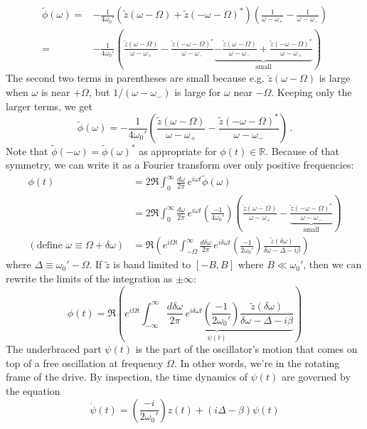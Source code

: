 \documentclass{article}
\begin{document}
\begin{align*}
  \tilde{\phi}(\omega)
  =& - \frac{1}{4 \omega_0'}
  \left( \tilde{z}(\omega - \Omega) + \tilde{z}(-\omega - \Omega)^* \right)
  \left(
    \frac{1}{\omega - \omega_+} - \frac{1}{\omega - \omega_-}
  \right) \\
  =& - \frac{1}{4 \omega_0'}
  \left(
      \frac{\tilde{z}(\omega - \Omega)}{\omega - \omega_+}
    - \frac{\tilde{z}(-\omega - \Omega)^*}{\omega - \omega_-}
    \underbrace{
      - \frac{\tilde{z}(\omega - \Omega)}{\omega - \omega_-}
      + \frac{\tilde{z}(-\omega - \Omega)^*}{\omega - \omega_+}
    }_\text{small}
  \right)
\end{align*}
The second two terms in parentheses are small because e.g. $\tilde{z}(\omega - \Omega)$ is large when $\omega$ is near $+\Omega$, but $1 / (\omega - \omega_-)$ is large for $\omega$ near $-\Omega$.
Keeping only the larger terms, we get
\begin{equation}
  \tilde{\phi}(\omega) =
  - \frac{1}{4 \omega_0'}
  \left(
      \frac{\tilde{z}(\omega - \Omega)}{\omega - \omega_+}
    - \frac{\tilde{z}(-\omega - \Omega)^*}{\omega - \omega_-}
  \right) \, .
\end{equation}
Note that $\tilde{\phi}(-\omega) = \tilde{\phi}(\omega)^*$ as appropriate for $\phi(t) \in \mathbb{R}$.
Because of that symmetry, we can write it as a Fourier transform over only positive frequencies:
\begin{align*}
  \phi(t)
  &= 2 \Re \int_0^\infty \frac{d\omega}{2\pi} \, e^{i \omega t} \tilde{\phi}(\omega) \\
  &= 2 \Re \int_0^\infty \frac{d\omega}{2\pi} \, e^{i \omega t} \left( \frac{-1}{4 \omega_0'} \right)
    \left(
      \frac{\tilde{z}(\omega - \Omega)}{\omega - \omega_+}
      - \underbrace{\frac{\tilde{z}(-\omega - \Omega)^*}{\omega - \omega_-}}_\text{small}
    \right) \\
  (\text{define } \omega \equiv \Omega + \delta \omega)
  &= \Re
  \left(
    e^{i \Omega t}
    \int_{-\Omega}^\infty \frac{d \delta \omega}{2\pi} \,
    e^{i \delta \omega t}
    \left( \frac{-1}{2 \omega_0'} \right)
    \frac{\tilde{z}(\delta \omega)}{\delta \omega - \Delta - i \beta}
  \right)
\end{align*}
where $\Delta \equiv \omega_0' - \Omega$.
If $\tilde{z}$ is band limited to $[-B, B]$ where $B \ll \omega_0'$, then we can rewrite the limits of the integration as $\pm \infty$:
\begin{equation}
  \phi(t) = \Re
  \left(
    e^{i \Omega t}
    \underbrace{
      \int_{-\infty}^\infty \frac{d \delta \omega}{2\pi} \,
      e^{i \delta \omega t}
      \left( \frac{-1}{2 \omega_0'} \right)
      \frac{\tilde{z}(\delta \omega)}{\delta \omega - \Delta - i \beta}
    }_{\psi(t)}
  \right)
\end{equation}
The underbraced part $\psi(t)$ is the part of the oscillator's motion that comes on top of a free oscillation at frequency $\Omega$.
In other words, we're in the rotating frame of the drive.
By inspection, the time dynamics of $\psi(t)$ are governed by the equation
\begin{equation}
  \dot{\psi}(t) = \left(\frac{-i}{2 \omega_0'}\right) z(t) + (i \Delta - \beta ) \psi(t)
\end{equation}
\end{document}
